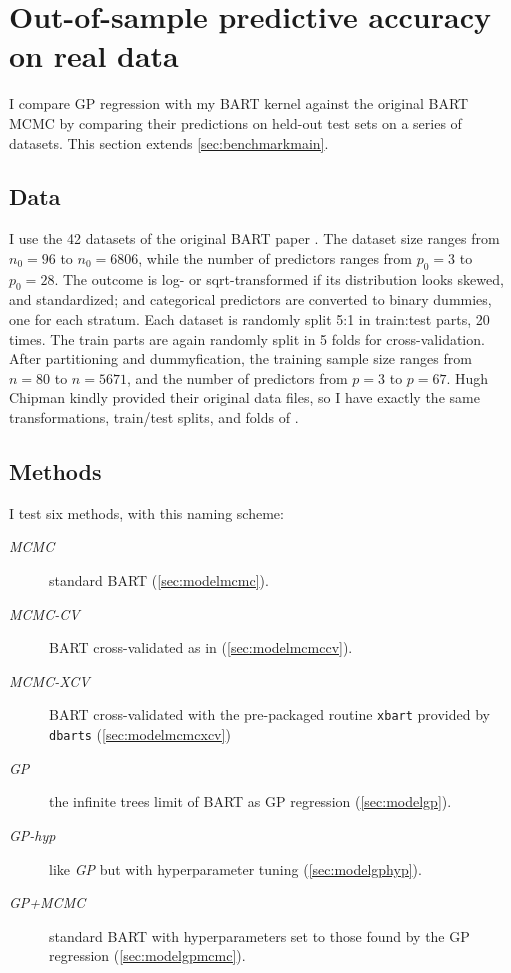 \documentclass[a4paper]{article}
\theoremstyle{definition}
\begin{document}
    \section{Out-of-sample predictive accuracy on real data}
    \label{sec:benchmark}

    I compare GP regression with my BART kernel against the original BART MCMC by comparing their predictions on held-out test sets on a series of datasets. This section extends \autoref{sec:benchmarkmain}.

    \subsection{Data}
    \label{sec:benchmarkdata}

    I use the 42 datasets of the original BART paper \autocite{chipman2010,kim2007}. The dataset size ranges from $n_0=96$ to $n_0=6806$, while the number of predictors ranges from $p_0=3$ to $p_0=28$. The outcome is log- or sqrt-transformed if its distribution looks skewed, and standardized; and categorical predictors are converted to binary dummies, one for each stratum.
    Each dataset is randomly split 5:1 in train:test parts, 20 times. The train parts are again randomly split in 5 folds for cross-validation. After partitioning and dummyfication, the training sample size ranges from $n=80$ to $n=5671$, and the number of predictors from $p=3$ to $p=67$. Hugh Chipman kindly provided their original data files, so I have exactly the same transformations, train/test splits, and folds of \textcite{chipman2010}.
    
    \subsection{Methods}

    I test six methods, with this naming scheme:
    \begin{description}
        \item[\emph{MCMC}] standard BART (\autoref{sec:modelmcmc}).
        \item[\emph{MCMC-CV}] BART cross-validated as in \textcite{chipman2010} (\autoref{sec:modelmcmccv}).
        \item[\emph{MCMC-XCV}] BART cross-validated with the pre-packaged routine \texttt{xbart} provided by \texttt{dbarts} (\autoref{sec:modelmcmcxcv})
        \item[\emph{GP}] the infinite trees limit of BART as GP regression (\autoref{sec:modelgp}).
        \item[\emph{GP-hyp}] like \emph{GP} but with hyperparameter tuning (\autoref{sec:modelgphyp}).
        \item[\emph{GP+MCMC}] standard BART with hyperparameters set to those found by the GP regression (\autoref{sec:modelgpmcmc}).
    \end{description}
\end{document}
